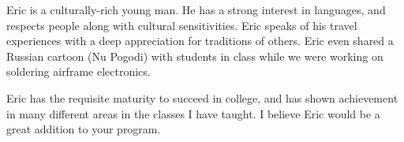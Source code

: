 \documentclass[12pt]{letter}
\begin{document}
\begin{letter}{%
}
Eric is a culturally-rich young man. He has a strong interest in languages, and respects people along with cultural sensitivities. Eric speaks of his travel experiences with a deep appreciation for traditions of others. Eric even shared a Russian cartoon (Nu Pogodi) with students in class while we were working on soldering airframe electronics. 

Eric has the requisite maturity to succeed in college, and has shown achievement in many different areas in the classes I have taught. I believe Eric would be a great addition to your program. 

\noclosing

\end{letter}
\end{document}
